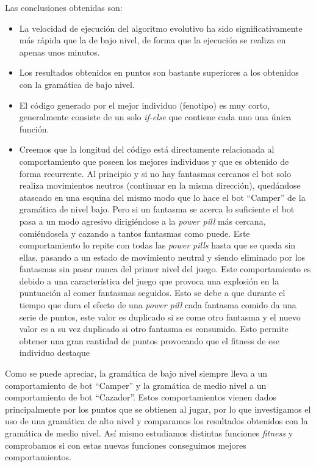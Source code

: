 Las conclusiones obtenidas son:
\begin{itemize}
\item La velocidad de ejecución del algoritmo evolutivo ha sido significativamente más rápida que la de bajo nivel, de forma que la ejecución se realiza en apenas unos minutos.

\item Los resultados obtenidos en puntos son bastante superiores a los obtenidos con la gramática de bajo nivel.

\item El código generado por el mejor individuo (fenotipo) es muy corto, generalmente consiste de un solo \textit{if-else} que contiene cada uno una única función.

\item Creemos que la longitud del código está directamente relacionada al comportamiento que poseen los mejores individuos y que es obtenido de forma recurrente. Al principio y si no hay fantasmas cercanos el bot solo realiza movimientos neutros (continuar en la misma dirección), quedándose atascado en una esquina del mismo modo que lo hace el bot ``Camper'' de la gramática de nivel bajo. Pero si un fantasma se acerca lo suficiente el bot pasa a un modo agresivo dirigiéndose a la \textit{power pill} más cercana, comiéndosela y cazando a tantos fantasmas como puede. Este comportamiento lo repite con todas las \textit{power pills} hasta que se queda sin ellas, pasando a un estado de movimiento neutral y siendo eliminado por los fantasmas sin pasar nunca del primer nivel del juego. Este comportamiento es debido a una característica del juego que provoca una explosión en la puntuación al comer fantasmas seguidos. Esto se debe a que durante el tiempo que dura el efecto de una \textit{power pill} cada fantasma comido da una serie de puntos, este valor es duplicado si se come otro fantasma y el nuevo valor es a su vez duplicado si otro fantasma es consumido. Esto permite obtener una gran cantidad de puntos provocando que el fitness de ese individuo destaque
\end{itemize}

Como se puede apreciar, la gramática de bajo nivel siempre lleva a un comportamiento de bot ``Camper'' y la gramática de medio nivel a un comportamiento de bot ``Cazador''. Estos comportamientos vienen dados principalmente por los puntos que se obtienen al jugar, por lo que investigamos el uso de una gramática de alto nivel y comparamos los resultados obtenidos con la gramática de medio nivel. Así mismo estudiamos distintas funciones \textit{fitness} y comprobamos si con estas nuevas funciones conseguimos mejores comportamientos.

